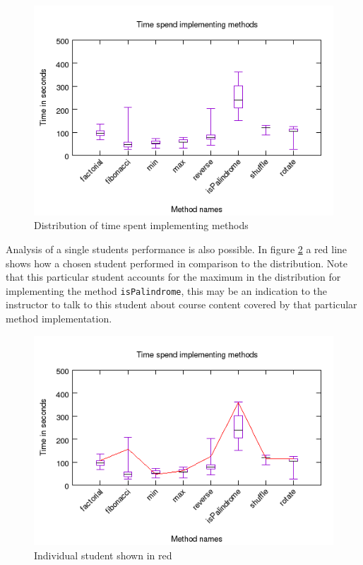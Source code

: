 \documentclass[twocolumn]{article}
\begin{document}
\begin{figure}[h!bt]
\includegraphics[width=\linewidth]{figures/method_time}
\caption{Distribution of time spent implementing methods}
\label{fig:method_time}
\end{figure}

Analysis of a single students performance is also possible. In figure
\ref{fig:student1} a red line shows how a chosen student performed in
comparison to the distribution. Note that this particular student accounts for
the maximum in the distribution for implementing the method
\texttt{isPalindrome}, this may be an indication to the instructor to talk to
this student about course content covered by that particular method
implementation.

\begin{figure}[h!bt]
\includegraphics[width=\linewidth]{figures/student1}
\caption{Individual student shown in red}
\label{fig:student1}
\end{figure}
\end{document}
